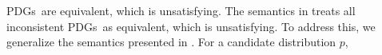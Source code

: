 \documentclass{article}
\newcommand{\V}{\mathcal V}
\newcommand{\MN}{PDG}
\newcommand{\MNs}{\MN s}
\numberwithin{equation}{section}
\begin{document}
\begin{notfocus}
        \MNs\ are equivalent, which is unsatisfying.  
        The semantics in  treats all
        inconsistent \MNs\ as equivalent, which is unsatisfying.  
 	To address this, we generalize the semantics presented in . 
 	For a candidate distribution $p$,

\end{notfocus}
\end{document}
